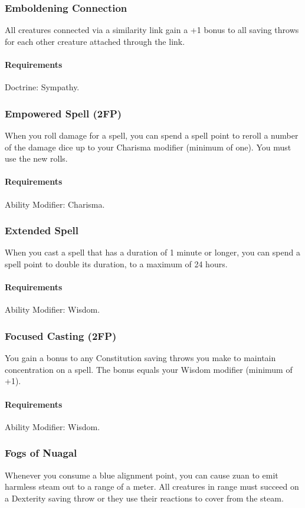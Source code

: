 \subsubsection{Emboldening Connection} \label{feat::emboldeningconnection}
    All creatures connected via a similarity link gain a +1 bonus to all saving throws for each other creature attached through the link.
    \paragraph{Requirements} Doctrine: Sympathy.
\subsubsection{Empowered Spell (2FP)} \label{feat::empoweredspell}
    When you roll damage for a spell, you can spend a spell point to reroll a number of the damage dice up to your Charisma modifier (minimum of one).
    You must use the new rolls.
    \paragraph{Requirements} Ability Modifier: Charisma.
\subsubsection{Extended Spell} \label{feat::extendedspell}
    When you cast a spell that has a duration of 1 minute or longer, you can spend a spell point to double its duration, to a maximum of 24 hours.
    \paragraph{Requirements} Ability Modifier: Wisdom.
\subsubsection{Focused Casting (2FP)} \label{feat::focusedcasting}
    You gain a bonus to any Constitution saving throws you make to maintain concentration on a spell.
    The bonus equals your Wisdom modifier (minimum of +1).
    \paragraph{Requirements} Ability Modifier: Wisdom.
\subsubsection{Fogs of Nuagal} \label{feat::fogsofnuagal}
    Whenever you consume a blue alignment point, you can cause zuan to emit harmless steam out to a range of a meter.
    All creatures in range must succeed on a Dexterity saving throw or they use their reactions to cover from the steam.
